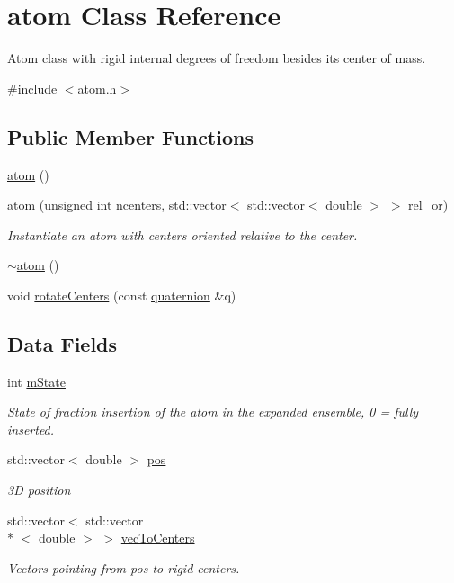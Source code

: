 \hypertarget{classatom}{\section{atom Class Reference}
\label{classatom}
}


Atom class with rigid internal degrees of freedom besides its center of mass.  




{\ttfamily \#include $<$atom.\-h$>$}

\subsection*{Public Member Functions}
\begin{DoxyCompactItemize}
\item 
\hyperlink{classatom_a2b63fdf85f714880c6af65b849bdb325}{atom} ()
\item 
\hyperlink{classatom_a5e8b18bca502d3a2a6d79ec5eb8b09ae}{atom} (unsigned int ncenters, std\-::vector$<$ std\-::vector$<$ double $>$ $>$ rel\-\_\-or)
\begin{DoxyCompactList}\small\item\em Instantiate an atom with centers oriented relative to the center. \end{DoxyCompactList}\item 
\hyperlink{classatom_a92f7ce8ce0c3e896e9455a7ceb5e7f85}{$\sim$atom} ()
\item 
void \hyperlink{classatom_a37cbc8cef7998850dc635b4dcbee724c}{rotate\-Centers} (const \hyperlink{classquaternion}{quaternion} \&q)
\end{DoxyCompactItemize}
\subsection*{Data Fields}
\begin{DoxyCompactItemize}
\item 
int \hyperlink{classatom_a3cb00c0c5b7533657e05af6ff4a42740}{m\-State}
\begin{DoxyCompactList}\small\item\em State of fraction insertion of the atom in the expanded ensemble, 0 = fully inserted. \end{DoxyCompactList}\item 
std\-::vector$<$ double $>$ \hyperlink{classatom_a3ae5f4880e7831d8b2c9fda72b4eb24a}{pos}
\begin{DoxyCompactList}\small\item\em 3\-D position \end{DoxyCompactList}\item 
std\-::vector$<$ std\-::vector\\*
$<$ double $>$ $>$ \hyperlink{classatom_a1376d52933b59a61ef76bf47f3f3732f}{vec\-To\-Centers}
\begin{DoxyCompactList}\small\item\em Vectors pointing from pos to rigid centers. \end{DoxyCompactList}\end{DoxyCompactItemize}


